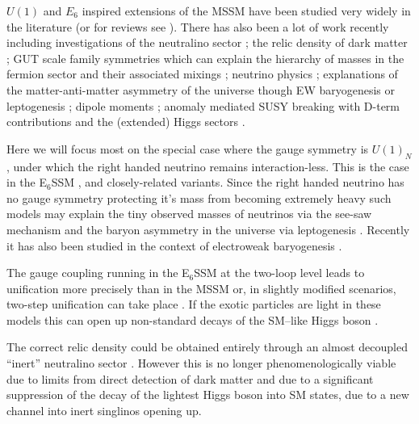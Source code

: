 \documentclass[preprint,amsmath,amssymb,aps,superscriptaddress,prd,showpacs,floatfix,nofootinbib]{revtex4-1}
\begin{document}
$U(1)$ and $E_6$ inspired extensions of the MSSM have been studied
very widely in the literature \cite{Gunion:1989we, Gunion:1992hs,
  Binetruy:1985xm, Ellis:1986yg, Ibanez:1986si, Gunion:1986ky,
  Haber:1986gz, Baer:1987eb, Gunion:1987jd, Grifols:1986vr,
  Ellis:1986ip, Morris:1987fm, Drees:1987tp, Ma:1995xk,
  Suematsu:1997tv, Suematsu:1997qt, Suematsu:1997au, Keith:1996fv,
  Keith:1997zb, Gherghetta:1996yr, Demir:1998dk, Langacker:1998tc,
  Hambye:2000bn, Ma:2000jf} (or for reviews see
\cite{Hewett:1988xc,Langacker:2008yv}).  There has also been a lot of
work recently including investigations of the neutralino sector
\cite{Hesselbach:2001ri, Barger:2005hb, Choi:2006fz,
  Barger:2007nv}; the relic density of dark matter
\cite{Kalinowski:2008iq}; GUT scale family symmetries which can
explain the hierarchy of masses in the fermion sector and their
associated mixings \cite{Stech:2008wd}; neutrino physics
\cite{Kang:2004ix}; explanations of the matter-anti-matter asymmetry
of the universe though EW baryogenesis or leptogenesis
\cite{Hambye:2000bn,Ma:2000jf,Kang:2004pp}; dipole moments
\cite{GutierrezRodriguez:2006hb}; anomaly mediated SUSY breaking with
D-term contributions \cite{Asano:2008ju} and the (extended) Higgs
sectors \cite{Daikoku:2000ep,Ham:2008xf}.



Here we will focus most on the special case where the gauge symmetry
is $U(1)_N$, under which the right handed neutrino remains
interaction-less. This is the case in the E$_6$SSM
\cite{King:2005jy,King:2005my,Athron:2010zz}, and closely-related
variants\cite{Howl:2007zi, Braam:2009fi, Braam:2010sy, Hall:2011zq,
  Nevzorov:2012hs, Athron:2014pua}.  Since the right handed neutrino
has no gauge symmetry protecting it's mass from becoming extremely
heavy such models may explain the tiny observed masses of neutrinos
via the see-saw mechanism and the baryon asymmetry in the universe via
leptogenesis \cite{Hambye:2000bn,King:2008qb, King:2008gw}.  Recently
it has also been studied in the context of electroweak baryogenesis
\cite{Chao:2014hya}.

The gauge coupling running in the E$_6$SSM at the two-loop level leads
to unification more precisely than in the MSSM \cite{King:2007uj} or,
in slightly modified scenarios, two-step unification can take place
\cite{Howl:2007hq,Howl:2007zi}. If the exotic particles are light in
these models this can open up non-standard decays of the SM--like
Higgs boson \cite{Hall:2010ix,Nevzorov:2013tta,Athron:2014pua}. 

The correct relic density could be obtained entirely through an almost
decoupled ``inert'' neutralino sector \cite{Hall:2009aj}.  However
this is no longer phenomenologically viable due to limits from direct
detection of dark matter
\cite{2011PhRvL.107m1302A,2012PhRvL.109r1301A, Akerib:2013tjd} and due
to a significant suppression of the decay of the lightest Higgs boson
into SM states, due to a new channel into inert singlinos opening up.
\end{document}
